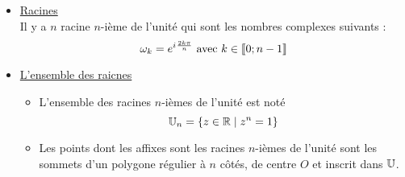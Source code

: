 \begin{defprop}[Cas particulier où \(z_0 = 1\)]
    \begin{itemize}
        \item \underline{Racines} \\
        Il y a \(n\) racine \(n\)-ième de l'unité qui sont les nombres complexes suivants : 
        \[\omega_k = e^{i\mkern1mu\frac{2k\pi}{n}} \text{ avec } k \in \left\llbracket0;n-1\right\rrbracket\] 
        \item \underline{L'ensemble des raicnes} \\
        \begin{itemize}
            \item L'ensemble des racines \(n\)-ièmes de l'unité est noté 
            \[\mathbb{U}_n = \left\lbrace z\in\mathbb{R} \;\middle|\; z^n = 1\right\rbrace\]
            \item Les points dont les affixes sont les racines \(n\)-ièmes de l’unité sont les sommets d’un polygone régulier à \(n\) côtés, de centre \(O\) et inscrit dans \(\mathbb{U}\).
        \end{itemize}
    \end{itemize}
\end{defprop}

